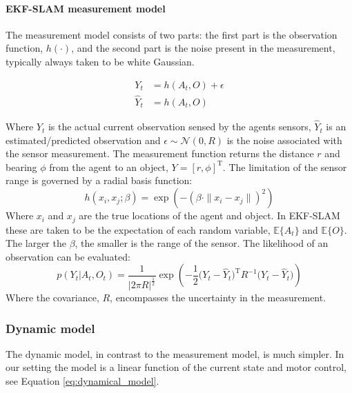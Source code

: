 \documentclass[review]{elsarticle}
\numberwithin{equation}{section}
\begin{document}
\paragraph{EKF-SLAM measurement model}

The measurement model consists of two parts: the first part is the observation function, $h(\cdot)$, and the second part is the noise present in the measurement, 
typically always taken to be white Gaussian.

\begin{align}
  Y_t &= h(A_t,O) + \epsilon \\\nonumber
 \hat{Y}_t &= h(A_t,O)  
\end{align}

Where $Y_t$ is the actual current observation sensed by the agents sensors, $\hat{Y}_t$ is an estimated/predicted observation
and $\epsilon \sim \mathcal{N}(0,R)$ is the noise associated with the sensor measurement.
The measurement function returns the distance $r$ and bearing $\phi$ from the agent to an object, $Y = \left[r,\phi \right]^{\mathrm{T}}$. 
The limitation of the sensor range is governed by a radial basis function:
\begin{equation}\label{eq:ekf-measurement_function}
 h(x_i,x_j;\beta) = \exp\left(-\left( \beta \cdot \|x_i - x_j\| \right)^2 \right)
\end{equation}
Where $x_i$ and $x_j$ are the true locations of the agent and object. In EKF-SLAM these are taken to be the 
expectation of each random variable, $\mathbb{E}\{A_t\}$ and $\mathbb{E}\{O\}$. The larger the $\beta$, the smaller is the range of 
the sensor. The likelihood of an observation can be evaluated:
\begin{equation} \label{eq:lik-measurement}
   p(Y_t|A_t,O_t) = \frac{1}{|2\pi R|^{\frac{1}{2}}} \exp \left( -\frac{1}{2} \big(Y_t - \hat{Y}_t\big)^{\mathrm{T}}R^{-1}\big(Y_t - \hat{Y}_t\big) \right)
\end{equation}
Where the covariance, $R$, encompasses the uncertainty in the measurement. 

\subsubsection{Dynamic model}

\label{subsub:dynamic-model}
The dynamic model, in contrast to the measurement model, is much simpler. In our setting the model is a linear function of the 
current state and motor control, see Equation \ref{eq:dynamical_model}.
\end{document}
